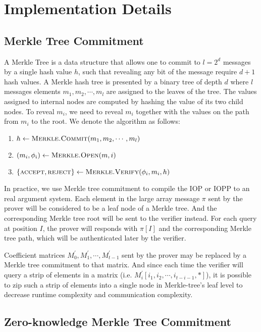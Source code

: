 \chapter{Implementation Details}

\section{Merkle Tree Commitment}

A Merkle Tree is a data structure that allows one to commit to $l = 2^{d}$ messages by a single hash value $h$, such that revealing any bit of the message require $d+1$ hash values. A Merkle hash tree is presented by a binary tree of depth $d$ where $l$ messages elements $m_1, m_2, \cdots, m_l$ are assigned to the leaves of the tree. The values assigned to internal nodes are computed by hashing the value of its two child nodes. To reveal $m_i$, we need to reveal $m_i$ together with the values on the path from $m_i$ to the root. We denote the algorithm as follows:

\begin{enumerate}
    \item $h \leftarrow \textsc{Merkle.Commit}(m_1, m_2, \cdots, m_l)$
    \item $(m_i, \phi_i) \leftarrow \textsc{Merkle.Open}(m, i)$
    \item $\{\textsc{accept}, \textsc{reject}\} \leftarrow \textsc{Merkle.Verify}(\phi_i, m_i, h)$
\end{enumerate}

In practice, we use Merkle tree commitment to compile the IOP or IOPP to an real argument system. Each element in the large array message $\pi$ sent by the prover will be considered to be a leaf node of a Merkle tree. And the corresponding Merkle tree root will be sent to the verifier instead. For each query at position $I$, the prover will responds with $\pi[I]$ and the corresponding Merkle tree path, which will be authenticated later by the verifier.

Coefficient matrices $M_0^\prime, M_1^\prime, \cdots, M_{t-1}^\prime$ sent by the prover may be replaced by a Merkle tree commitment to that matrix. And since each time the verifier will query a strip of elements in a matrix (i.e. $M_i^\prime[i_1, i_2, \cdots, i_{t-i-1}, *]$), it is possible to zip such a strip of elements into a single node in Merkle-tree's leaf level to decrease runtime complexity and communication complexity.

\section{Zero-knowledge Merkle Tree Commitment}

